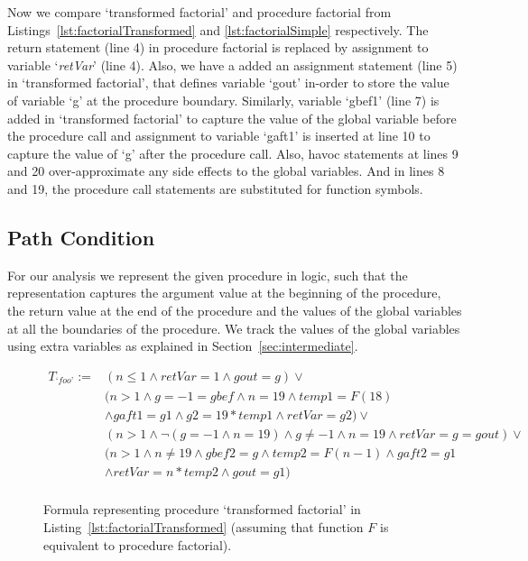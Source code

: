\documentclass{llncs}
\newcommand{\foo}{\textit{`foo'}}
\newcommand{\pathCondition}{\mathit{T_{\foo}}}
\newcommand{\retVar}{\textit{retVar}}
\newcommand{\F}{\mathit{F}}
\begin{document}
Now we compare `transformed factorial' and procedure factorial from
Listings~\ref{lst:factorialTransformed} and \ref{lst:factorialSimple}
respectively. The return statement (line 4) in procedure factorial
is replaced by assignment to variable `\retVar' (line 4). Also, we
have a added an assignment statement (line 5) in `transformed
factorial', that defines variable `gout' in-order to store the value
of variable `g' at the procedure boundary. Similarly, variable `gbef1'
(line 7) is added in `transformed factorial' to capture the value of
the global variable before the procedure call and assignment to
variable `gaft1' is inserted at line 10 to capture the value of `g'
after the procedure call. Also, havoc statements at lines 9 and 20
over-approximate any side effects to the global variables. And in
lines 8 and 19, the procedure call statements are substituted for
function symbols.

\subsection{Path Condition} For our analysis we represent the given
procedure in logic, such that the representation captures the
argument value at the beginning of the procedure, the return value at
the end of the procedure and the values of the global variables at all
the boundaries of the procedure.
We track the values of the global variables using
extra variables as explained in Section~\ref{sec:intermediate}.

\begin{figure}
  \begin{align*}
    \pathCondition :=
    &(n \leq 1 \wedge retVar = 1 \wedge gout = g) \vee \\
    &(n > 1 \wedge g = -1 = gbef \wedge n = 19 \wedge temp1 = \F(18) \\
    \;&\wedge gaft1 = g1 \wedge g2 = 19 * temp1
    \wedge retVar = g2) \vee\\
    &(n > 1 \wedge \neg( g = -1 \wedge n = 19) \wedge g \neq -1
    \wedge n = 19 \wedge retVar = g = gout) \vee\\
    &(n > 1 \wedge n \neq 19 \wedge gbef2 = g \wedge temp2 = \F( n
    - 1) \wedge gaft2 = g1\\
    &\wedge retVar = n * temp2 \wedge gout = g1)\\
  \end{align*}
  \caption{Formula representing procedure `transformed factorial' in
    Listing~\ref{lst:factorialTransformed} (assuming that function
    $\F$ is equivalent to procedure factorial).}
  \label{fig:pathCondition}
\end{figure}
\end{document}
